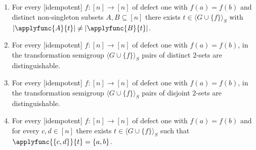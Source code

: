 \begin{theorem}
\begin{enumerate}[label=(\arabic*)]
\item \label{sync_max:thm:ab_subsets_different_cardinality} For every [idempotent] $f\colon [n] \to [n]$ of defect one with $f(a) = f(b)$
and distinct non-singleton subsets $A, B \subseteq [n]$ 
there exists $t \in \langle G \cup \{f\} \rangle_S$
with $|\applyfunc{A}{t}| \ne |\applyfunc{B}{t}|$. 





\item \label{sync_max:thm:ab_distinguishes_2_sets} For every [idempotent] $f\colon [n]\to [n]$ of defect one with $f(a) = f(b)$,
in the transformation semigroup $\langle G \cup \{f\} \rangle_S$
pairs of distinct $2$-sets are distinguishable.


\item \label{sync_max:thm:ab_distinguishes_disjoint_2_sets} For every [idempotent] $f\colon  [n] \to [n]$ of defect one with $f(a) = f(b)$,
in the transformation semigroup $\langle G \cup \{f\} \rangle_S$ 
pairs of disjoint $2$-sets are distinguishable.



\item \label{sync_max:thm:2-hom} For every [idempotent] $f\colon [n] \to [n]$ of defect one with $f(a) = f(b)$
and for every $c,d \in [n]$ there exists $t \in \langle G \cup \{f\} \rangle_S$ 
such that $\applyfunc{\{c,d\}}{t} = \{a,b\}$.   



\end{enumerate}
\end{theorem}
